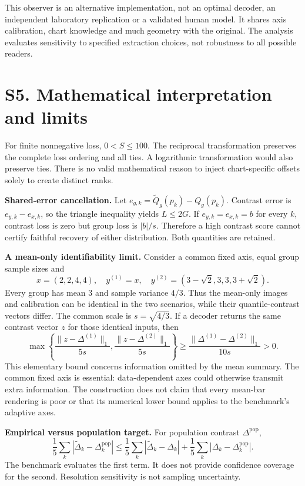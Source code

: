 \documentclass[10pt]{article}
\begin{document}
This observer is an alternative implementation, not an optimal decoder, an independent laboratory replication or a validated human model. It shares axis calibration, chart knowledge and much geometry with the original. The analysis evaluates sensitivity to specified extraction choices, not robustness to all possible readers.

\section*{S5. Mathematical interpretation and limits}
For finite nonnegative loss, $0<S\leq100$. The reciprocal transformation preserves the complete loss ordering and all ties. A logarithmic transformation would also preserve ties. There is no valid mathematical reason to inject chart-specific offsets solely to create distinct ranks.

\textbf{Shared-error cancellation.} Let $e_{g,k}=\widetilde Q_g(p_k)-Q_g(p_k)$. Contrast error is $e_{y,k}-e_{x,k}$, so the triangle inequality yields $L\leq2G$. If $e_{y,k}=e_{x,k}=b$ for every $k$, contrast loss is zero but group loss is $|b|/s$. Therefore a high contrast score cannot certify faithful recovery of either distribution. Both quantities are retained.

\textbf{A mean-only identifiability limit.} Consider a common fixed axis, equal group sample sizes and
\[
 x=(2,2,4,4),\quad y^{(1)}=x,\quad y^{(2)}=(3-\sqrt2,3,3,3+\sqrt2).
\]
Every group has mean 3 and sample variance $4/3$. Thus the mean-only images and calibration can be identical in the two scenarios, while their quantile-contrast vectors differ. The common scale is $s=\sqrt{4/3}$. If a decoder returns the same contrast vector $z$ for those identical inputs, then
\[
 \max\!\left\{\frac{\|z-\Delta^{(1)}\|_1}{5s},\frac{\|z-\Delta^{(2)}\|_1}{5s}\right\}
 \geq \frac{\|\Delta^{(1)}-\Delta^{(2)}\|_1}{10s}>0.
\]
This elementary bound concerns information omitted by the mean summary. The common fixed axis is essential: data-dependent axes could otherwise transmit extra information. The construction does not claim that every mean-bar rendering is poor or that its numerical lower bound applies to the benchmark's adaptive axes.

\textbf{Empirical versus population target.} For population contrast $\Delta^{\mathrm{pop}}$,
\[
\frac15\sum_k|\widetilde\Delta_k-\Delta^{\mathrm{pop}}_k|
\leq\frac15\sum_k|\widetilde\Delta_k-\Delta_k|+\frac15\sum_k|\Delta_k-\Delta^{\mathrm{pop}}_k|.
\]
The benchmark evaluates the first term. It does not provide confidence coverage for the second. Resolution sensitivity is not sampling uncertainty.
\end{document}
